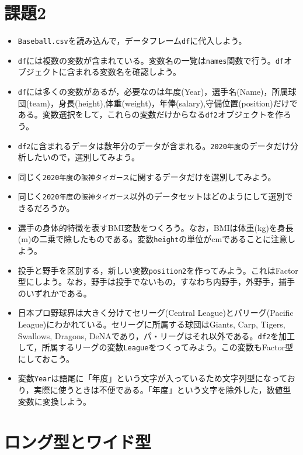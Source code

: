 \documentclass[
  a4paper,
]{ltjsbook}
\providecommand{\tightlist}{%
  \setlength{\itemsep}{0pt}\setlength{\parskip}{0pt}}\usepackage{longtable,booktabs,array}
\begin{document}
\section{課題2}\label{ux8ab2ux984c2}

\begin{itemize}
\tightlist
\item
  \texttt{Baseball.csv}を読み込んで，データフレーム\texttt{df}に代入しよう。
\item
  \texttt{df}には複数の変数が含まれている。変数名の一覧は\texttt{names}関数で行う。\texttt{df}オブジェクトに含まれる変数名を確認しよう。
\item
  \texttt{df}には多くの変数があるが，必要なのは年度(Year)，選手名(Name)，所属球団(team)，身長(height),体重(weight)，年俸(salary),守備位置(position)だけである。変数選択をして，これらの変数だけからなる\texttt{df2}オブジェクトを作ろう。
\item
  \texttt{df2}に含まれるデータは数年分のデータが含まれる。\texttt{2020年度}のデータだけ分析したいので，選別してみよう。
\item
  同じく\texttt{2020年度}の\texttt{阪神タイガース}に関するデータだけを選別してみよう。
\item
  同じく\texttt{2020年度}の\texttt{阪神タイガース}以外のデータセットはどのようにして選別できるだろうか。
\item
  選手の身体的特徴を表すBMI変数をつくろう。なお，BMIは体重(kg)を身長(m)の二乗で除したものである。変数\texttt{height}の単位がcmであることに注意しよう。
\item
  投手と野手を区別する，新しい変数\texttt{position2}を作ってみよう。これはFactor型にしよう。なお，野手は投手でないもの，すなわち内野手，外野手，捕手のいずれかである。
\item
  日本プロ野球界は大きく分けてセリーグ(Central League)とパリーグ(Pacific
  League)にわかれている。セリーグに所属する球団はGiants, Carp, Tigers,
  Swallows, Dragons,
  DeNAであり，パ・リーグはそれ以外である。\texttt{df2}を加工して，所属するリーグの変数\texttt{League}をつくってみよう。この変数もFactor型にしておこう。
\item
  変数\texttt{Year}は語尾に「年度」という文字が入っているため文字列型になっており，実際に使うときは不便である。「年度」という文字を除外した，数値型変数に変換しよう。
\end{itemize}

\section{ロング型とワイド型}\label{ux30edux30f3ux30b0ux578bux3068ux30efux30a4ux30c9ux578b}
\end{document}
